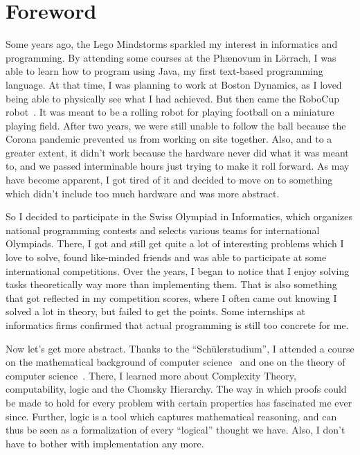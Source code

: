 \chapter*{Foreword}

Some years ago, the Lego Mindstorms sparkled my interest in informatics and programming.
By attending some courses at the Phænovum in Lörrach, I was able to learn how to program using Java, my first text-based programming language.
At that time, I was planning to work at Boston Dynamics, as I loved being able to physically see what I had achieved.
But then came the RoboCup robot~\cite{roboCup}.
It was meant to be a rolling robot for playing football on a miniature playing field.
After two years, we were still unable to follow the ball because the Corona pandemic prevented us from working on site together.
Also, and to a greater extent, it didn't work because the hardware never did what it was meant to, and we passed interminable hours just trying to make it roll forward.
As may have become apparent, I got tired of it and decided to move on to something which didn't include too much hardware and was more abstract.

So I decided to participate in the Swiss Olympiad in Informatics, which organizes national programming contests and selects various teams for international Olympiads.
There, I got and still get quite a lot of interesting problems which I love to solve, found like-minded friends and was able to participate at some international competitions.
Over the years, I began to notice that I enjoy solving tasks theoretically way more than implementing them.
That is also something that got reflected in my competition scores, where I often came out knowing I solved a lot in theory, but failed to get the points.
Some internships at informatics firms confirmed that actual programming is still too concrete for me.

Now let's get more abstract.
Thanks to the ``Schülerstudium'', I attended a course on the mathematical background of computer science~\cite{discrete-maths} and one on the theory of computer science~\cite{theory-cs}.
There, I learned more about Complexity Theory, computability, logic and the Chomsky Hierarchy.
The way in which proofs could be made to hold for every problem with certain properties has fascinated me ever since.
Further, logic is a tool which captures mathematical reasoning, and can thus be seen as a formalization of every ``logical'' thought we have.
Also, I don't have to bother with implementation any more.

